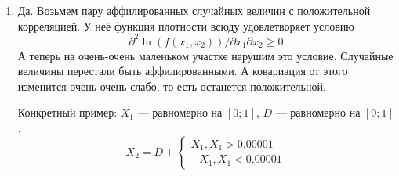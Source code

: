 \begin{enumerate}
\item Да. Возьмем пару аффилированных случайных величин с положительной корреляцией. У неё функция плотности всюду удовлетворяет условию
\begin{equation}
\partial^{2}\ln (f(x_{1},x_{2}))/\partial x_{1}\partial x_{2} \geq 0
\end{equation}
А теперь на очень-очень маленьком участке нарушим это условие. Случайные величины перестали быть аффилированными. А ковариация от этого изменится очень-очень слабо, то есть останется положительной.

Конкретный пример: $ X_{1} $ —  равномерно на $ [0;1] $, $ D $ — равномерно на $ [0;1] $.
\begin{equation}
X_{2}=D+
\begin{cases}
X_{1}, X_{1}>0.00001 \\
-X_{1}, X_{1}<0.00001
\end{cases}
\end{equation}


\end{enumerate}
